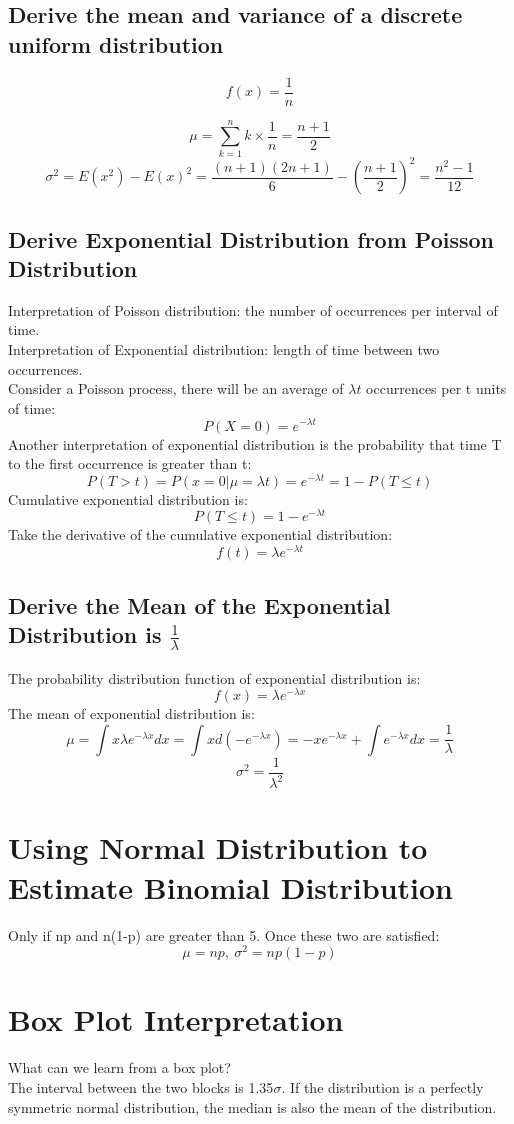 \documentclass{article}
\begin{document}
\subsection{Derive the mean and variance of a discrete uniform distribution}
\[f(x) =\frac{1}{n}\]

\[\mu = \sum_{k=1}^n k \times \frac{1}{n}=\frac{n+1}{2}\]
\[\sigma ^2=E(x^2)-E(x)^2=\frac{(n+1)(2n+1)}{6}-(\frac{n+1}{2})^2=\frac{n^2-1}{12}\]
\subsection{Derive Exponential Distribution from Poisson Distribution}
Interpretation of Poisson distribution: the number of occurrences per interval of time.\\
Interpretation of Exponential distribution: length of time between two occurrences.\\
Consider a Poisson process, there will be an average of $\lambda t$ occurrences per t units of time:
\[P(X=0)=e^{-\lambda t}\]
Another interpretation of exponential distribution is the probability that time T to the first occurrence is greater than t:
\[P(T>t)=P(x=0|\mu=\lambda t)=e^{-\lambda t}=1-P(T \leq t)\]
Cumulative exponential distribution is:
\[P(T \leq t)=1-e^{-\lambda t}\]
Take the derivative of the cumulative exponential distribution:
\[f(t)=\lambda e^{-\lambda t}\]
\subsection{Derive the Mean of the Exponential Distribution is $\frac{1}{\lambda}$}
The probability distribution function of exponential distribution is:
\[f(x)=\lambda e^{-\lambda x}\]
The mean of exponential distribution is:
\[\mu = \int x\lambda e^{-\lambda x}dx=\int xd(-e^{-\lambda x})=-xe^{-\lambda x}+\int e^{-\lambda x}dx=\frac{1}{\lambda}\]
\[\sigma^2=\frac{1}{\lambda^2}\]
\section{Using Normal Distribution to Estimate Binomial Distribution}
Only if np and n(1-p) are greater than 5. Once these two are satisfied:
\[\mu =np,\ \sigma^2 = np(1-p)\]
\section{Box Plot Interpretation}
What can we learn from a box plot?\\
The interval between the two blocks is 1.35$\sigma$. If the distribution is a perfectly symmetric normal distribution, the median is also the mean of the distribution.
\end{document}
